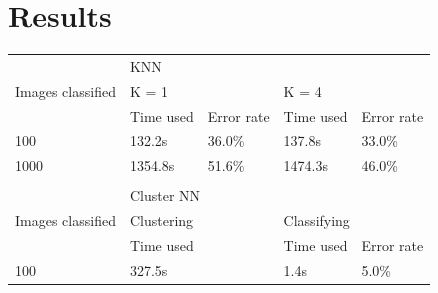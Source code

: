 \documentclass{article}
\begin{document}
\newpage

\section{Results}
\begin{table}[]
\centering
\begin{tabular}{lllll}
\hline
\multicolumn{1}{|l|}{\multirow{3}{*}{Images classified}} & \multicolumn{4}{l|}{KNN}                                                                                                            \\ \cline{2-5}
\multicolumn{1}{|l|}{}                                   & \multicolumn{2}{l|}{K = 1}                                       & \multicolumn{2}{l|}{K = 4}                                       \\ \cline{2-5}
\multicolumn{1}{|l|}{}                                   & \multicolumn{1}{l|}{Time used} & \multicolumn{1}{l|}{Error rate} & \multicolumn{1}{l|}{Time used} & \multicolumn{1}{l|}{Error rate} \\ \hline
\multicolumn{1}{|l|}{100}                                & \multicolumn{1}{l|}{132.2s}    & \multicolumn{1}{l|}{36.0\%}     & \multicolumn{1}{l|}{137.8s}    & \multicolumn{1}{l|}{33.0\%}     \\ \hline
\multicolumn{1}{|l|}{1000}                               & \multicolumn{1}{l|}{1354.8s}   & \multicolumn{1}{l|}{51.6\%}     & \multicolumn{1}{l|}{1474.3s}   & \multicolumn{1}{l|}{46.0\%}     \\ \hline
                                                         &                                &                                 &                                &                                 \\ \hline
\multicolumn{1}{|l|}{\multirow{3}{*}{Images classified}} & \multicolumn{4}{l|}{Cluster NN}                                                                                                     \\ \cline{2-5}
\multicolumn{1}{|l|}{}                                   & \multicolumn{2}{l|}{Clustering}                                  & \multicolumn{2}{l|}{Classifying}                                 \\ \cline{2-5}
\multicolumn{1}{|l|}{}                                   & \multicolumn{2}{l|}{Time used}                                   & \multicolumn{1}{l|}{Time used} & \multicolumn{1}{l|}{Error rate} \\ \hline
\multicolumn{1}{|l|}{100}                                & \multicolumn{2}{l|}{327.5s}                                      & \multicolumn{1}{l|}{1.4s}      & \multicolumn{1}{l|}{5.0\%}      \\ \hline

\end{tabular}
\end{table}
\end{document}
